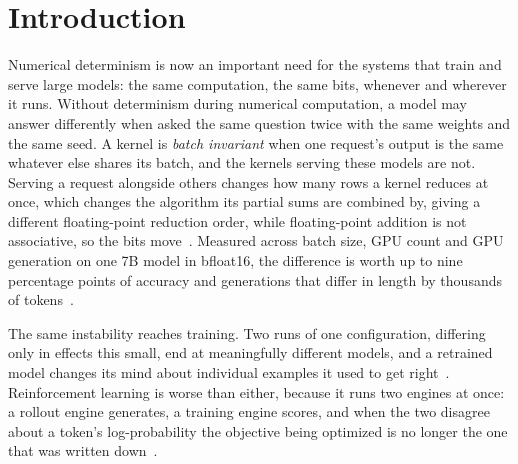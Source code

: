 \documentclass[sigplan,nonacm]{acmart}
\begin{document}

\maketitle

\section{Introduction}
\label{sec:intro}


Numerical determinism is now an important need for the systems that train and
serve large models: the same computation, the same bits, whenever and wherever
it runs. Without determinism during numerical computation, a model may answer differently
when asked the same question twice with the same weights and the same seed.
A kernel is \emph{batch invariant} when one request's output is the same whatever else
shares its batch, and the kernels serving these models are not. 
Serving a request alongside others changes how many rows a kernel reduces at once, which
changes the algorithm its partial sums are combined by, giving a different
floating-point reduction order, while floating-point addition
is not associative, so the bits move~\cite{he2025defeating}.   
Measured across batch size, GPU count and GPU generation on one 7B model in bfloat16, the
difference is worth up to nine percentage points of accuracy and generations
that differ in length by thousands of tokens~\cite{llmnondeterminism2025}.


The same instability reaches training. Two runs of one configuration, differing only in
effects this small, end at meaningfully different models, and a retrained model
changes its mind about individual examples it used to get
right~\cite{summers2021nondeterminism,bhojanapalli2021reproducibility}.
Reinforcement learning is worse than either, because it runs two engines at
once: a rollout engine generates, a training engine scores, and when the two
disagree about a token's log-probability the objective being optimized is no
longer the one that was written down~\cite{fp16mismatch}.
\end{document}
